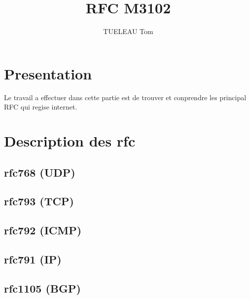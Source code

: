 \documentclass[5pt]{article}
\begin{document}
\title{RFC M3102}
\author{TUELEAU Tom}
    \section{Presentation}
    Le travail a effectuer dans cette partie est de trouver et conprendre les principal RFC qui regise internet.
    \section{Description des rfc}
    \subsection{rfc768 (UDP)}
    \subsection{rfc793 (TCP)}
    \subsection{rfc792 (ICMP)}
    \subsection{rfc791 (IP)}
    \subsection{rfc1105 (BGP)}
\end{document}
